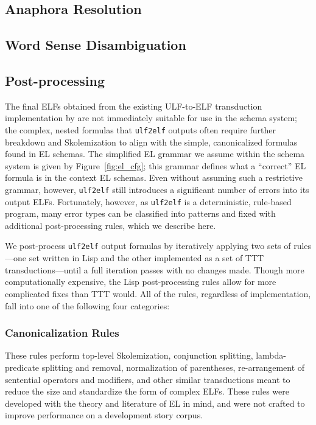 \subsection{Anaphora Resolution}

\subsection{Word Sense Disambiguation}

\subsection{Post-processing}
\label{subsec:postproc}
The final ELFs obtained from the existing ULF-to-ELF transduction implementation by \citet{schubert-2014-treebank} are not immediately suitable for use in the schema system; the complex, nested formulas that \texttt{ulf2elf} outputs often require further breakdown and Skolemization to align with the simple, canonicalized formulas found in EL schemas. The simplified EL grammar we assume within the schema system is given by Figure~\ref{fig:el_cfg}; this grammar defines what a ``correct'' EL formula is in the context EL schemas. Even without assuming such a restrictive grammar, however, \texttt{ulf2elf} still introduces a significant number of errors into its output ELFs. Fortunately, however, as \texttt{ulf2elf} is a deterministic, rule-based program, many error types can be classified into patterns and fixed with additional post-processing rules, which we describe here.

We post-process \texttt{ulf2elf} output formulas by iteratively applying two sets of rules---one set written in Lisp and the other implemented as a set of TTT transductions---until a full iteration passes with no changes made. Though more computationally expensive, the Lisp post-processing rules allow for more complicated fixes than TTT would. All of the rules, regardless of implementation, fall into one of the following four categories:

\subsubsection{Canonicalization Rules}
These rules perform top-level Skolemization, conjunction splitting, lambda-predicate splitting and removal, normalization of parentheses, re-arrangement of sentential operators and modifiers, and other similar transductions meant to reduce the size and standardize the form of complex ELFs. These rules were developed with the theory and literature of EL in mind, and were not crafted to improve performance on a development story corpus.

